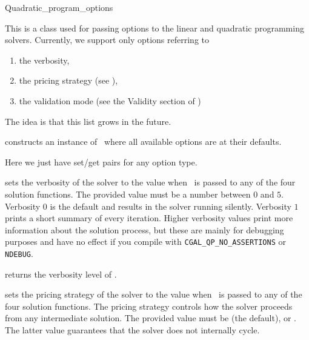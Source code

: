 \begin{ccRefClass}{Quadratic_program_options}


\ccDefinition
This is a class used for passing options to the linear and
quadratic programming solvers. Currently, we support only
options referring to
\begin{enumerate}
\item the verbosity, 
\item the pricing strategy (see ),
\item the validation mode (see the Validity section of
)
\end{enumerate}
The idea is that this list grows in the future.

\ccCreation
\ccIndexClassCreation
{}

{constructs an instance of \ccRefName\ where all available options
are at their defaults.}

\ccOperations
Here we just have set/get pairs for any option type.


{sets the verbosity of the solver to the value  when
\ccVar\ is passed to any of the four solution functions. The provided
value must be a number between $0$ and $5$. Verbosity $0$ is the default and
results in the solver running silently. Verbosity $1$ prints a short
summary of every iteration. Higher verbosity values print more information
about the solution process, but these are mainly for debugging 
purposes and have no effect if you compile with 
\texttt{CGAL\_QP\_NO\_ASSERTIONS} or \texttt{NDEBUG}.}

{returns the verbosity level of \ccVar.}


{sets the pricing strategy of the solver to the value 
when \ccVar\ is passed to any of the four solution functions. The pricing
strategy controls how the solver proceeds from any intermediate solution.
The provided value must be  (the default), or 
. The latter value guarantees that the solver does
not internally cycle.}


\end{ccRefClass}
